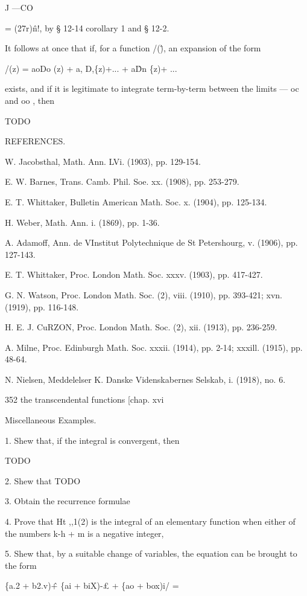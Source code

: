 J —CO

= (27r)\^n!, by § 12-14 corollary 1 and § 12-2.

It follows at once that if, for a function /(\^), an expansion of the
form

/(z) = aoDo (z) + a, D,\{z)+... + a\^Dn \{z)+ ...

exists, and if it is legitimate to integrate term-by-term between the
limits — oc and oo , then



TODO



REFERENCES.

W. Jacobsthal, Math. Ann. LVi. (1903), pp. 129-154.

E. W. Barnes, Trans. Camb. Phil. Soe. xx. (1908), pp. 253-279.

E. T. Whittaker, Bulletin American Math. Soc. x. (1904), pp. 125-134.

H. Weber, Math. Ann. i. (1869), pp. 1-36.

A. Adamoff, Ann. de VInstitut Polytechnique de St Petershourg, v.
(1906), pp. 127-143.

E. T. Whittaker, Proc. London Math. Soc. xxxv. (1903), pp. 417-427.

G. N. Watson, Proc. London Math. Soc. (2), viii. (1910), pp. 393-421;
xvn. (1919), pp. 116-148.

H. E. J. CuRZON, Proc. London Math. Soc. (2), xii. (1913), pp.
236-259.

A. Milne, Proc. Edinburgh Math. Soc. xxxii. (1914), pp. 2-14; xxxill.
(1915), pp. 48-64.

N. Nielsen, Meddelelser K. Danske Videnskabernes Selskab, i. (1918),
no. 6.



352 the transcendental functions [chap. xvi

Miscellaneous Examples.

1. Shew that, if the integral is convergent, then

TODO

2. Shew that TODO

3. Obtain the recurrence formulae

4. Prove that Ht ,,1(2) is the integral of an elementary function when
either of the numbers k-h + m is a negative integer,

5. Shew that, by a suitable change of variables, the equation can be
brought to the form



\{a.2 + b2.v)\^ + \{ai + biX)-£ + \{ao + box)i/ =



